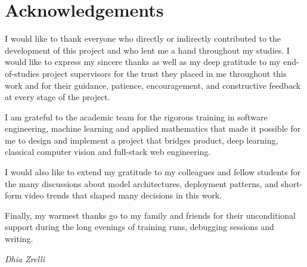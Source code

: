 \chapter*{Acknowledgements}
\thispagestyle{plain}

\vspace{1cm}

\begin{center}
\begin{minipage}{0.85\linewidth}

I would like to thank everyone who directly or indirectly contributed to the development of
this project and who lent me a hand throughout my studies. I would like to express my sincere
thanks as well as my deep gratitude to my end-of-studies project supervisors for the trust they
placed in me throughout this work and for their guidance, patience, encouragement, and
constructive feedback at every stage of the project.

I am grateful to the academic team for the rigorous training in software engineering, machine
learning and applied mathematics that made it possible for me to design and implement a
project that bridges product, deep learning, classical computer vision and full-stack web
engineering.

I would also like to extend my gratitude to my colleagues and fellow students for the many
discussions about model architectures, deployment patterns, and short-form video trends that
shaped many decisions in this work.

Finally, my warmest thanks go to my family and friends for their unconditional support during
the long evenings of training runs, debugging sessions and writing.

\vspace{1cm}
\hfill \textit{Dhia Zrelli}

\end{minipage}
\end{center}

\cleardoublepage
